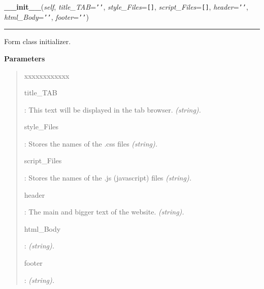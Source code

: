 \hspace{.8\funcindent}\begin{boxedminipage}{\funcwidth}

    \raggedright \textbf{\_\_init\_\_}(\textit{self}, \textit{title\_TAB}={\tt \texttt{'}\texttt{}\texttt{'}}, \textit{style\_Files}={\tt \texttt{[}\texttt{]}}, \textit{script\_Files}={\tt \texttt{[}\texttt{]}}, \textit{header}={\tt \texttt{'}\texttt{}\texttt{'}}, \textit{html\_Body}={\tt \texttt{'}\texttt{}\texttt{'}}, \textit{footer}={\tt \texttt{'}\texttt{}\texttt{'}})

    \vspace{-1.5ex}

    \rule{\textwidth}{0.5\fboxrule}
\setlength{\parskip}{2ex}

Form class initializer.
%
\begin{quote}

\end{quote}
\setlength{\parskip}{1ex}
      \textbf{Parameters}
      \vspace{-1ex}

      \begin{quote}
        \begin{Ventry}{xxxxxxxxxxxx}

          \item[title\_TAB]


:                          This text will be displayed in the tab browser. \emph{(string).}
          \item[style\_Files]


:                Stores the names of the .css files \emph{(string).}
          \item[script\_Files]


:               Stores the names of the .js (javascript) files \emph{(string).}
          \item[header]


:                             The main and bigger text of the website. \emph{(string).}
          \item[html\_Body]


:                  \emph{(string).}
          \item[footer]


:                             \emph{(string).}
        \end{Ventry}

      \end{quote}

    \end{boxedminipage}

